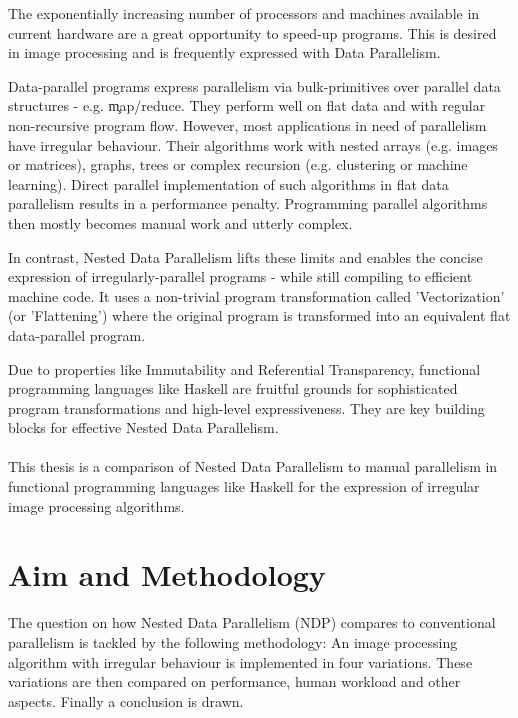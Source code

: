 

The exponentially increasing number of processors and machines
available in current hardware are a great
opportunity to speed-up programs.
This is desired in image processing
and is frequently expressed with Data Parallelism.

Data-parallel programs express parallelism
via bulk-primitives over parallel data structures - e.g. \c{map/reduce}.
They perform well on flat data and with regular
non-recursive program flow.
However, most applications in need of parallelism
have irregular behaviour. Their
algorithms work with nested
arrays (e.g. images or matrices),
graphs, trees or complex recursion (e.g. clustering or machine learning).
Direct parallel implementation of such algorithms
in flat data parallelism results in
a performance penalty.
Programming parallel algorithms then mostly
becomes manual work and utterly complex.

In contrast, Nested Data Parallelism \cite{Belloch1996} lifts these limits
and enables the concise expression of irregularly-parallel programs
- while still compiling to efficient machine code.
It uses a non-trivial program transformation called 'Vectorization'
(or 'Flattening') where the original program is transformed
into an equivalent flat data-parallel program.

Due to properties like Immutability and Referential Transparency,
functional programming languages like Haskell are fruitful grounds for
sophisticated program transformations
and high-level expressiveness. They are key building
blocks for effective Nested Data Parallelism.

\paragraph{}
This thesis is a comparison of Nested Data Parallelism
to manual parallelism in functional programming languages like Haskell for the
expression of irregular image processing algorithms.


\section{Aim and Methodology}
  The question on how Nested Data Parallelism (NDP) compares to
  conventional parallelism is tackled by the following methodology:
  An image processing algorithm with irregular behaviour
  is implemented in four variations. These variations are
  then compared on performance, human workload and other aspects.
  Finally a conclusion is drawn.
  
